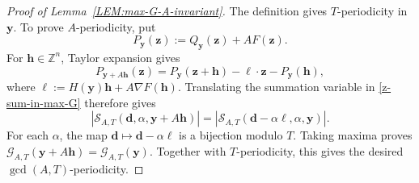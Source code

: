 \documentclass[a4paper,11pt, twoside,reqno]{amsart}
\theoremstyle{plain}
\theoremstyle{definition}
\theoremstyle{remark}
\newcommand{\bfh}{\bm{h}}
\newcommand{\bfy}{\bm{y}}
\newcommand{\bfz}{\bm{z}}
\newcommand{\bfd}{\bm{d}}
\newcommand{\ZZ}{\mathbb{Z}}
\numberwithin{equation}{section}
\begin{document}
\begin{proof}[Proof of Lemma~\ref{LEM:max-G-A-invariant}]
The definition gives $T$-periodicity in $\bfy$.
To prove $A$-periodicity, put
$$
P_{\bfy}(\bfz):=Q_{\bfy}(\bfz)+AF(\bfz).
$$
For $\bfh\in\ZZ^n$, Taylor expansion gives
$$
P_{\bfy+A\bfh}(\bfz)
=P_{\bfy}(\bfz+\bfh)
-\boldsymbol{\ell}\cdot\bfz-P_{\bfy}(\bfh),
$$
where
$\boldsymbol{\ell}:=H(\bfy)\bfh+A\nabla F(\bfh)$.
Translating the summation variable in
\eqref{z-sum-in-max-G} therefore gives
$$
|\mathcal S_{A,T}(\bfd,\alpha,\bfy+A\bfh)|
=
|\mathcal S_{A,T}(\bfd-\alpha\boldsymbol{\ell},
\alpha,\bfy)|.
$$
For each $\alpha$, the map
$\bfd\mapsto\bfd-\alpha\boldsymbol{\ell}$
is a bijection modulo $T$.
Taking maxima proves
$\mathcal G_{A,T}(\bfy+A\bfh)=\mathcal G_{A,T}(\bfy)$.
Together with $T$-periodicity, this gives the desired
$\gcd(A,T)$-periodicity.
\end{proof}
\end{document}
